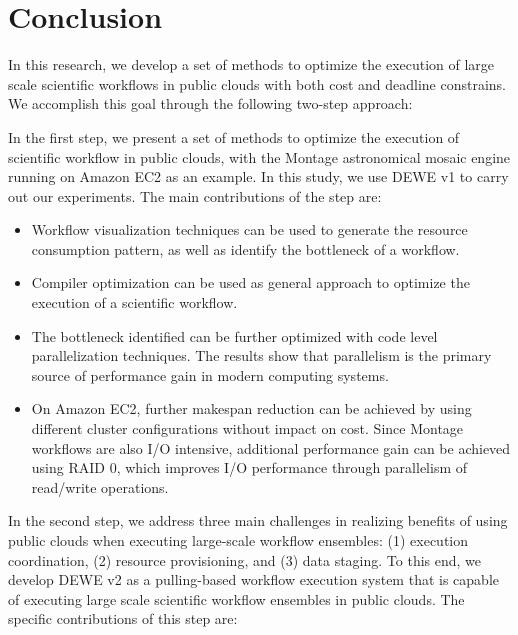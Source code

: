 \chapter{Conclusion}
\label{chapter:conclusion}

In this research, we develop a set of methods to optimize the execution of large scale scientific workflows in public clouds with both cost and deadline constrains. We accomplish this goal through the following two-step approach: 

In the first step, we present a set of methods to optimize the execution of scientific workflow in public clouds, with the Montage astronomical mosaic engine running on Amazon EC2 as an example. In this study, we use DEWE v1 to carry out our experiments. The main contributions of the step are:

\begin{itemize}
	\item Workflow visualization techniques can be used to generate the resource consumption pattern, as well as identify the bottleneck of a workflow. 
	\item Compiler optimization can be used as general approach to optimize the execution of a scientific workflow. 
	\item The bottleneck identified can be further optimized with code level parallelization techniques. The results show that parallelism is the primary source of performance gain in modern computing systems.
	\item On Amazon EC2, further makespan reduction can be achieved by using different cluster configurations without impact on cost. Since Montage workflows are also I/O intensive, additional performance gain can be achieved using RAID 0, which improves I/O performance through parallelism of read/write operations.
\end{itemize}
	
In the second step, we address three main challenges in realizing benefits of using public clouds when executing large-scale workflow ensembles: (1) execution coordination, (2) resource provisioning, and (3) data staging. To this end, we develop DEWE v2 as a pulling-based workflow execution system that is capable of executing large scale scientific workflow ensembles in public clouds. The specific contributions of this step are:

